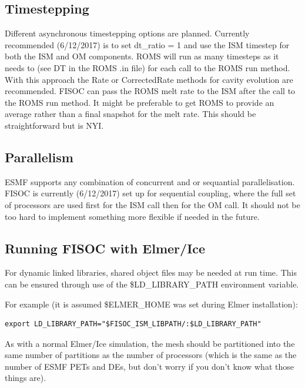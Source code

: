 \documentclass[11pt]{article}
\begin{document}
\subsection{Timestepping}

Different asynchronous timestepping options are planned.
Currently recommended (6/12/2017) is to set dt\_ratio = 1 and use the 
ISM timestep for both the ISM and OM components. 
ROMS will run as many timesteps as it needs to (see DT in the ROMS .in file) 
for each call to the ROMS run method. 
With this approach the Rate or CorrectedRate methods for cavity evolution 
are recommended. 
FISOC can pass the ROMS melt rate to the ISM after the call to the 
ROMS run method. 
It might be preferable to get ROMS to provide an average rather than a final 
snapshot for the melt rate. This should be straightforward but is NYI.





\subsection{Parallelism}

ESMF supports any combination of concurrent and or sequantial parallelisation. 
FISOC is currently (6/12/2017) set up for sequential coupling, where the 
full set of processors are used first for the ISM call then for the OM call. 
It should not be too hard to implement something more flexible if needed 
in the future.



\subsection{Running FISOC with Elmer/Ice} 
For dynamic linked libraries, shared object files may be needed at run time.  
This can be ensured through use of 
the \$LD\_LIBRARY\_PATH environment variable. 

For example (it is assumed \$ELMER\_HOME was set during Elmer installation):
\begin{lstlisting}
export LD_LIBRARY_PATH="$FISOC_ISM_LIBPATH/:$LD_LIBRARY_PATH"
\end{lstlisting}

As with a normal Elmer/Ice simulation, the mesh should be partitioned into the 
same number of partitions as the number of processors (which is the same as the number of 
ESMF PETs and DEs, but don't worry if you don't know what those things are). 
\end{document}
